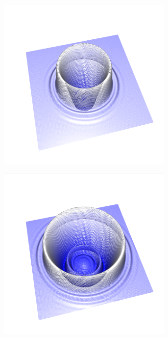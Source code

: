 \documentclass[crop=false,10pt,ngerman]{standalone}
\begin{document}
\begin{figure}[h]
\begin{subfigure}[b]{0.24\textwidth}
          \includegraphics[trim={2cm 1.5cm 1.2cm 1.0cm},clip,width=0.95\textwidth]{images/quad_wave_1.png}
          \caption{}
        \end{subfigure}
        \begin{subfigure}[b]{0.24\textwidth}
          \center
          \includegraphics[trim={2cm 1.5cm 1.2cm 1.0cm},clip,width=0.95\textwidth]{images/quad_wave_2.png}

\end{subfigure}
\end{figure}
\end{document}
